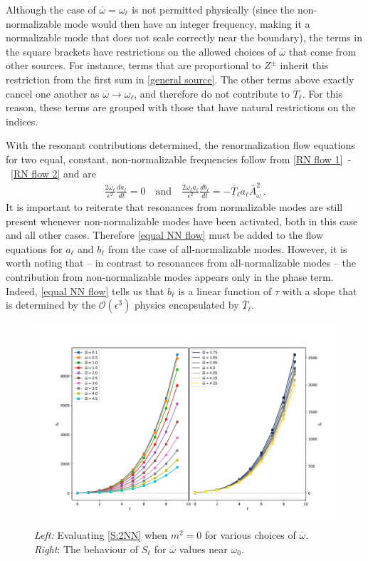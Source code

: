 \documentclass[letterpaper,11pt]{article}
\newcommand{\ol}{\omega_\ell}
\newcommand{\mc}{\mathcal}
\newcommand{\ob}{\overline{\omega}}
\begin{document}
Although the case of $\ob = \ol$ is not permitted physically (since the non-normalizable mode would then have an integer frequency, making it a normalizable mode that does not scale correctly near the boundary), the terms in the square brackets have restrictions on the allowed choices of $\ob$ that come from other sources. For instance, terms that are proportional to $Z^{\pm}$ inherit this restriction from the first sum in \eqref{general source}. The other terms above exactly cancel one another as $\ob \to \ol$, and therefore do not contribute to $\overline{T}_\ell$. For this reason, these terms are grouped with those that have natural restrictions on the indices. 

With the resonant contributions determined, the renormalization flow equations for two equal, constant, non-normalizable frequencies follow from \eqref{RN flow 1}~-~\eqref{RN flow 2} and are
\begin{align}
\label{equal NN flow}
\frac{2 \ol}{\epsilon^2} \frac{d a_\ell}{dt} =  0 \quad \text{and} \quad \frac{2 \ol a_\ell}{\epsilon^2} \frac{d b_\ell}{d t} = - \overline{T}_\ell a_\ell \bar A^2_{\ob} \, .
\end{align}
It is important to reiterate that resonances from normalizable modes are still present whenever non-normalizable modes have been activated, both in this case and all other cases. Therefore \eqref{equal NN flow} must be added to the flow equations for $a_\ell$ and $b_\ell$ from the case of all-normalizable modes. However, it is worth noting that -- in contrast to resonances from all-normalizable modes -- the contribution from non-normalizable modes appears only in the phase term. Indeed, \eqref{equal NN flow} tells us that $b_\ell$ is a linear function of $\tau$ with a slope that is determined by the $\mc O(\epsilon^3)$ physics encapsulated by $\overline{T}_\ell$.

\begin{figure}
\centering
\includegraphics[width=\textwidth]{./figures/NN_equalfreq_sourceterms_m0_0+zoom}
\caption{{\it Left:} Evaluating \eqref{S:2NN} when $m^2 = 0$ for various choices of $\ob$. {\it Right}: The behaviour of $S_\ell$ for $\ob$ values near $\omega_0$.}
\label{fig:equal_frequency_m0}
\end{figure}
\end{document}
